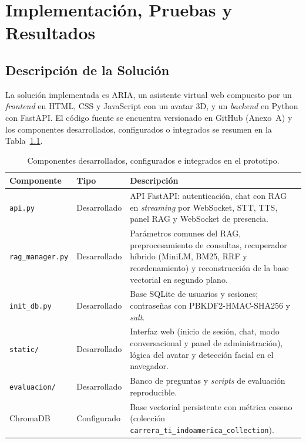 \chapter{Implementación, Pruebas y Resultados}
\label{chap:implementacion}

\section{Descripción de la Solución}
La solución implementada es ARIA, un asistente virtual web compuesto por un \textit{frontend} en HTML, CSS y JavaScript con un avatar 3D, y un \textit{backend} en Python con FastAPI. El código fuente se encuentra versionado en GitHub (Anexo~A) y los componentes desarrollados, configurados o integrados se resumen en la Tabla~\ref{tab:componentes}.

\begin{table}[H]
  \caption{Componentes desarrollados, configurados e integrados en el prototipo.}
  \label{tab:componentes}
  \centering
  \footnotesize
  \renewcommand{\arraystretch}{1.1}
  \begin{tabular}{|>{\raggedright\arraybackslash}p{3.3cm}|>{\raggedright\arraybackslash}p{2.6cm}|>{\raggedright\arraybackslash}p{6.7cm}|}
    \hline
    \rowcolor[HTML]{EFEFEF}
    \textbf{Componente} & \textbf{Tipo} & \textbf{Descripción} \\ \hline
    \texttt{api.py} & Desarrollado & API FastAPI: autenticación, chat con RAG en \textit{streaming} por WebSocket, STT, TTS, panel RAG y WebSocket de presencia. \\ \hline
    \texttt{rag\_\allowbreak{}manager.\allowbreak{}py} & Desarrollado & Parámetros comunes del RAG, preprocesamiento de consultas, recuperador híbrido (MiniLM, BM25, RRF y reordenamiento) y reconstrucción de la base vectorial en segundo plano. \\ \hline
    \texttt{init\_db.py} & Desarrollado & Base SQLite de usuarios y sesiones; contraseñas con PBKDF2-HMAC-SHA256 y \textit{salt}. \\ \hline
    \texttt{static/} & Desarrollado & Interfaz web (inicio de sesión, chat, modo conversacional y panel de administración), lógica del avatar y detección facial en el navegador. \\ \hline
    \texttt{evaluacion/} & Desarrollado & Banco de preguntas y \textit{scripts} de evaluación reproducible. \\ \hline
    ChromaDB & Configurado & Base vectorial persistente con métrica coseno (colección \texttt{carrera\_\allowbreak{}ti\_\allowbreak{}indoamerica\_\allowbreak{}collection}). \\ \hline

\end{tabular}
\end{table}
